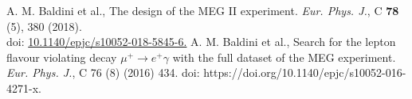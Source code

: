 \documentclass[Yonemoto_master.tex]{subfiles}
\begin{document}
{ }{
\begin{thebibliography}{99}
 A. M. Baldini et al., The design of the MEG II experiment. {\it Eur. Phys. J.}, C {\bf 78} (5), 380 (2018). \\ 
doi: \href{https://doi.org/10.1140/epjc/s10052-018-5845-6}{10.1140/epjc/s10052-018-5845-6.}
 A. M. Baldini et al., Search for the lepton flavour violating decay $\mu^+ \to e^+ \gamma$ with the full dataset of the MEG experiment. {\it Eur. Phys. J.}, C 76 (8) (2016) 434. 
doi: https://doi.org/10.1140/epjc/s10052-016-4271-x. 
\end{thebibliography}
}
\end{document}
